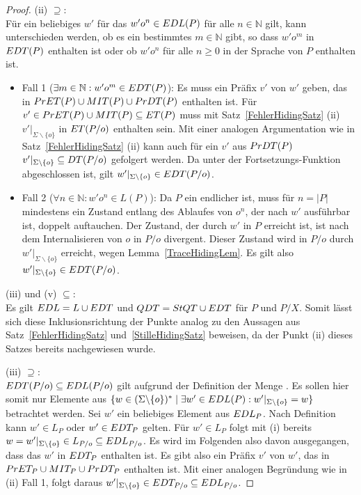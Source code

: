 \begin{proof}
  (ii)  \glqq $\supseteq$\grqq{}:\\
  Für ein beliebiges $w'$ für das $w'o^n\in EDL (P)$ für alle $n\in\mathbb{N}$
  gilt, kann unterschieden werden, ob es ein bestimmtes $m\in\mathbb{N}$ gibt,
  so dass $w'o^m$ in $EDT (P)$ enthalten ist oder ob $w'o^n$ für alle $n\geq
  0$ in der Sprache von $P$ enthalten ist.
  \begin{itemize}
    \item Fall 1 ($\exists m\in\mathbb{N}: w'o^m\in EDT (P)$): Es muss ein
      Präfix $v'$ von $w'$ geben, das in $PrET (P)\cup MIT (P)\cup PrDT (P)$
      enthalten ist. Für $v'\in PrET (P)\cup MIT (P) \subseteq ET (P)$ muss
      mit Satz~\ref{FehlerHidingSatz} (ii) $v'|_{\Sigma\backslash\{o\}}$ in
      $ET (P/o)$ enthalten sein. Mit einer analogen Argumentation wie in
      Satz~\ref{FehlerHidingSatz} (ii) kann auch für ein $v'$ aus $PrDT (P)$
      $v'|_{\Sigma\backslash\{o\}}\subseteq DT (P/o)$ gefolgert werden. Da
      \EDT{} unter der Fortsetzungs-Funktion \cont{} abgeschlossen ist, gilt
      $w'|_{\Sigma\backslash\{o\}}\in EDT (P/o)$.
    \item Fall 2 ($\forall n\in\mathbb{N}: w'o^n\in L (P)$): Da $P$ ein
      endlicher \MEIO{} ist, muss für $n = |P|$ mindestens ein Zustand entlang
      des Ablaufes von $o^n$, der nach $w'$ ausführbar ist, doppelt auftauchen.
      Der Zustand, der durch $w'$ in $P$ erreicht ist, ist nach dem
      Internalisieren von $o$ in $P/o$ divergent. Dieser Zustand wird in $P/o$
      durch $w'|_{\Sigma\backslash\{o\}}$ erreicht, wegen
      Lemma~\ref{TraceHidingLem}. Es gilt also $w'|_{\Sigma\backslash\{o\}} \in
      EDT (P/o)$.
  \end{itemize}

  (iii) und (v) \glqq $\subseteq$\grqq{}:\\
  Es gilt $EDL = L \cup EDT$ und $QDT = StQT \cup EDT$ für $P$ und $P/X$.
  Somit lässt sich diese Inklusionsrichtung der Punkte analog zu den Aussagen
  aus Satz~\ref{FehlerHidingSatz} und~\ref{StilleHidingSatz} beweisen, da der
  Punkt (ii) dieses Satzes bereits nachgewiesen wurde.

  (iii) \glqq $\supseteq$\grqq{}:\\
  $EDT (P/o)\subseteq EDL (P/o)$ gilt aufgrund der Definition der Menge
  \EDL{}. Es sollen hier somit nur Elemente aus $\{w\in (\Sigma\backslash
  \{o\})^*\mid \exists w'\in EDL(P): w'|_{\Sigma\backslash \{o\}} = w\}$
  betrachtet werden. Sei $w'$ ein beliebiges Element aus $EDL _P$. Nach
  Definition kann $w'\in L_P$ oder $w'\in EDT _P$ gelten. Für $w'\in L_P$ folgt
  mit (i) bereits $w = w'|_{\Sigma\backslash \{o\}}\in L_{P/o}\subseteq EDL
  _{P/o}$. Es wird im Folgenden also davon ausgegangen, dass das $w'$ in $EDT
  _P$ enthalten ist. Es gibt also ein Präfix $v'$ von $w'$, das in $PrET_P
  \cup MIT _P\cup PrDT _P$ enthalten ist. Mit einer analogen Begründung wie
  in (ii) Fall 1, folgt daraus $w'|_{\Sigma\backslash\{o\}} \in EDT _{P/o}
  \subseteq EDL _{P/o}$.


\end{proof}
